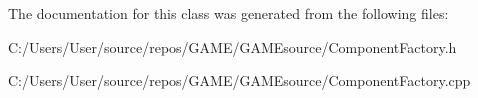 The documentation for this class was generated from the following files\+:\begin{DoxyCompactItemize}
\item 
C\+:/\+Users/\+User/source/repos/\+G\+A\+M\+E/\+G\+A\+M\+Esource/Component\+Factory.\+h\item 
C\+:/\+Users/\+User/source/repos/\+G\+A\+M\+E/\+G\+A\+M\+Esource/Component\+Factory.\+cpp\end{DoxyCompactItemize}
